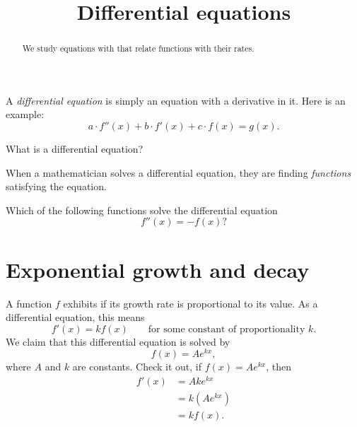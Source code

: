 \documentclass{ximera}
\title[Dig-In:]{Differential equations}
\begin{document}
\begin{abstract}
  We study equations with that relate functions with their rates.
\end{abstract}
\maketitle

A \textit{differential equation} is
simply an equation with a derivative in it. Here is an example:
\[
a\cdot f''(x) + b\cdot f'(x) + c\cdot f(x) = g(x). 
\]
\begin{question}
  What is a differential equation?
  \begin{multipleChoice}
  \end{multipleChoice}
\end{question}

When a mathematician solves a differential equation, they are finding
\textit{functions} satisfying the equation.
\begin{question}
  Which of the following functions solve the differential equation
  \[
  f''(x) = -f(x)?
  \]
  \begin{selectAll}
  \end{selectAll}
\end{question}






\section{Exponential growth and decay}

A function $f$ exhibits  if its growth rate is
proportional to its value. As a differential equation, this means
\[
f'(x) = k f(x)\qquad\text{for some constant of proportionality $k$.}
\]
We claim that this differential equation is solved by
\[
f(x) = Ae^{kx},
\]
where $A$ and $k$ are constants.  Check it out, if $f(x) = Ae^{kx}$,
then
\begin{align*}
f'(x) &= Ak e^{kx}\\
&= k\left(Ae^{kx} \right)\\
&= k f(x).
\end{align*}
\end{document}

